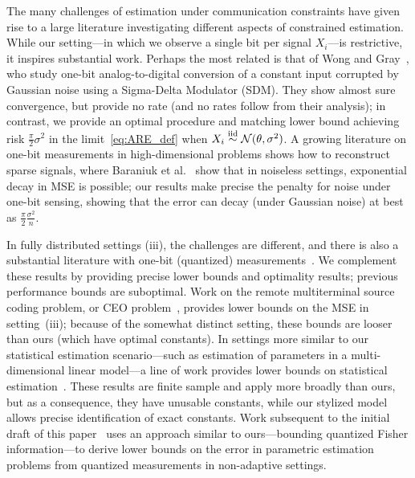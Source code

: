 The many challenges of estimation under communication constraints have given
rise to a large literature investigating different aspects of constrained
estimation. While our setting---in which we observe a single bit per signal
$X_i$---is restrictive, it inspires substantial work.  Perhaps the most
related is that of Wong and Gray~\cite{53738}, who study one-bit
analog-to-digital conversion of a constant input corrupted by Gaussian noise
using a Sigma-Delta Modulator (SDM). They show almost sure convergence, but
provide no rate (and no rates follow from their analysis); in contrast, we
provide an optimal procedure and matching lower bound achieving risk
$\frac{\pi}{2} \sigma^2$ in the limit~\eqref{eq:ARE_def} when $X_i \stackrel{\textup{iid}}{\sim}
\mathcal{N}(\theta, \sigma^2)$. A growing literature on one-bit measurements in
high-dimensional problems \cite{baraniuk2017exponential, DavenportPlVaWo15,
  PlanVe13} shows how to reconstruct sparse signals, where Baraniuk et
al.~\cite{baraniuk2017exponential} show that in noiseless settings,
exponential decay in MSE is possible; our results make precise the penalty
for noise under one-bit sensing, showing that the error can decay (under
Gaussian noise) at best as $\frac{\pi}{2} \frac{\sigma^2}{n}$.

In fully distributed settings (iii), the challenges are different, and there
is also a substantial literature with one-bit (quantized)
measurements~\cite{904560,4244748, 6882252, chen2010performance, 5184907}.
We complement these results by providing precise lower bounds and optimality
results; previous performance bounds are suboptimal.  Work on the remote
multiterminal source coding problem, or CEO problem~\cite{berger1996ceo,
  viswanathan1997quadratic, oohama1998rate, prabhakaran2004rate}, provides
lower bounds on the MSE in setting~(iii); because of the somewhat distinct
setting, these bounds are looser than ours (which have optimal constants).
In settings more similar to our statistical estimation scenario---such as
estimation of parameters in a multi-dimensional linear model---a line of
work provides lower bounds on statistical
estimation~\cite{zhang2013information, duchi2014optimality, GargMaNg14,
  BravermanGaMaNgWo16, DBLP:journals/corr/abs-1802-08417,
  zhang1988estimation, han2018distributed, xu2017information}. These results
are finite sample and apply more broadly than ours, but as a consequence,
they have unusable constants, while our stylized model allows precise
identification of exact constants.  Work subsequent to the initial draft of
this paper~\cite{Barnes2018} uses an approach similar to ours---bounding
quantized Fisher information---to derive lower bounds on the error in
parametric estimation problems from quantized measurements in non-adaptive
settings.

